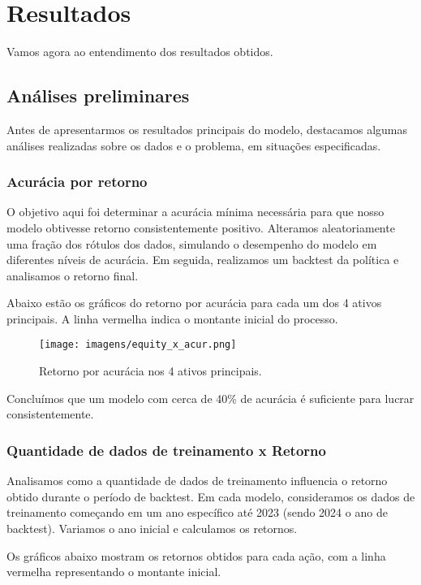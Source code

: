 \documentclass{article}
\begin{document}
\newpage

\section{Resultados}
Vamos agora ao entendimento dos resultados obtidos.

\subsection{Análises preliminares}
Antes de apresentarmos os resultados principais do modelo, destacamos algumas análises realizadas sobre os dados e o problema, em situações especificadas.

\subsubsection{Acurácia por retorno}
O objetivo aqui foi determinar a acurácia mínima necessária para que nosso modelo obtivesse retorno consistentemente positivo. Alteramos aleatoriamente uma fração dos rótulos dos dados, simulando o desempenho do modelo em diferentes níveis de acurácia. Em seguida, realizamos um backtest da política e analisamos o retorno final.

Abaixo estão os gráficos do retorno por acurácia para cada um dos 4 ativos principais. A linha vermelha indica o montante inicial do processo.

\begin{figure}[H]
    \centering
    \texttt{[image: imagens/equity\_x\_acur.png]}
    \caption{Retorno por acurácia nos 4 ativos principais.}
    \label{fig:retorno-acuracia}
\end{figure}

Concluímos que um modelo com cerca de 40\% de acurácia é suficiente para lucrar consistentemente.

\subsubsection{Quantidade de dados de treinamento x Retorno}
Analisamos como a quantidade de dados de treinamento influencia o retorno obtido durante o período de backtest. Em cada modelo, consideramos os dados de treinamento começando em um ano específico até 2023 (sendo 2024 o ano de backtest). Variamos o ano inicial e calculamos os retornos.

Os gráficos abaixo mostram os retornos obtidos para cada ação, com a linha vermelha representando o montante inicial.
\end{document}
